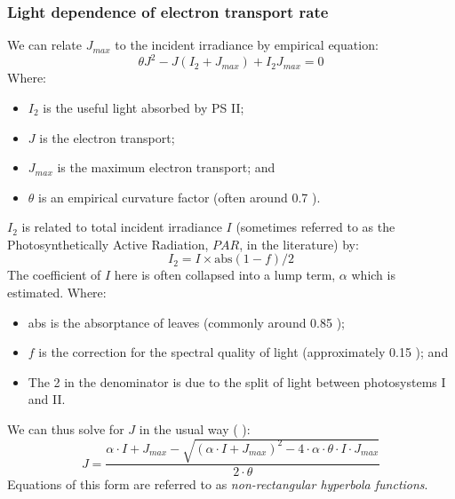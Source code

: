 \documentclass[11pt]{article} %
\begin{document}
\subsubsection{Light dependence of electron transport rate}
We can relate $J_{max}$ to the incident irradiance by empirical equation:
\begin{equation} \label{J_J_max_relationship}
 \theta J^2 - J\left (I_2 + J_{max}\right ) + I_2J_{max} = 0
\end{equation}
Where:
\begin{itemize}
 \item $I_2$ is the useful light absorbed by PS II;
 \item $J$ is the electron transport;
 \item $J_{max}$ is the maximum electron transport; and
 \item $\theta$ is an empirical curvature factor (often around 0.7 \cite{EvansPhotosynthesisnitrogenrelationships1989}).
\end{itemize}
$I_2$ is related to total incident irradiance $I$ (sometimes referred to as the Photosynthetically Active Radiation, $PAR$, in the literature) by:
\begin{equation}
I_2 = I \times \textrm{abs}(1-f)/2
\end{equation}
The coefficient of $I$ here is often collapsed into a lump term, $\alpha$ which is estimated. 
Where:
\begin{itemize}
 \item abs is the absorptance of leaves (commonly around 0.85 \cite{CaemmererBiochemicalmodelsleaf2000});
 \item $f$ is the correction for the spectral quality of light (approximately 0.15 \cite{EvansDependenceQuantumYield1987}); and
 \item The 2 in the denominator is due to the split of light between photosystems I and II.
\end{itemize}
We can thus solve for $J$ in the usual way (\cite{QianEstimationphotosynthesisparameters2012} \cite{YinC3C4photosynthesis2009}):
\begin{equation} \label{nonrectangular_hyperbola}
J = \frac{\alpha \cdot I + J_{max} - \sqrt{\left (\alpha \cdot I + J_{max}\right )^2 - 4 \cdot \alpha \cdot \theta \cdot I \cdot J_{max}}}{2  \cdot\theta}
\end{equation}
Equations of this form are referred to as \emph{non-rectangular hyperbola functions}.
\end{document}
